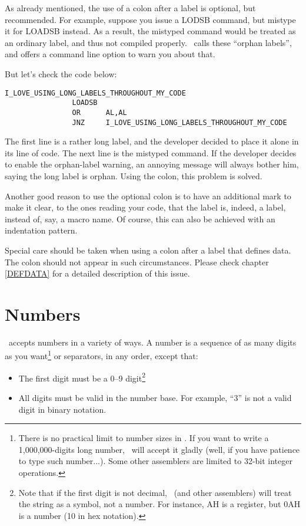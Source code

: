 \documentclass[a4paper,draft,12pt]{book}
\begin{document}
As already mentioned, the use of a colon after a label is optional,
but recommended. For example, suppose you issue a LODSB command, but
mistype it for LOADSB instead. As a result, the mistyped command would
be treated as an ordinary label, and thus not compiled properly. \nasm\ 
calls these ``orphan labels'', and offers a command line option to
warn you about that.

But let's check the code below:

\begin{verbatim}
I_LOVE_USING_LONG_LABELS_THROUGHOUT_MY_CODE
                LOADSB
                OR      AL,AL
                JNZ     I_LOVE_USING_LONG_LABELS_THROUGHOUT_MY_CODE
\end{verbatim}

The first line is a rather long label, and the developer decided
to place it alone in its line of code. The next line is the mistyped
command. If the developer decides to enable the orphan-label warning,
an annoying message will always bother him, saying the long label
is orphan. Using the colon, this problem is solved.

Another good reason to use the optional colon is to have an additional
mark to make it clear, to the ones reading your code, that the label is,
indeed, a label, instead of, say, a macro name. Of course, this can
also be achieved with an indentation pattern.

Special care should be taken when using a colon after a label that
defines data. The colon should not appear in such circumstances. Please
check chapter \ref{DEFDATA} for a detailed description of this issue.

\chapter{Numbers\label{NUMCHAP}}
\popasm\ accepts numbers in a variety of ways. A number is a sequence
of as many digits as you want\footnote{There is no practical limit to
number sizes in \popasm. If you want to write a 1,000,000-digits long
number, \popasm\ will accept it gladly (well, if you have patience to
type such number...). Some other assemblers are limited to 32-bit
integer operations.} or separators, in any order, except that:

\begin{itemize}
\item{The first digit must be a 0--9 digit\footnote{Note that if the
   first digit is not decimal, \popasm\ (and other assemblers) will treat
   the string as a symbol, not a number. For instance, AH is a register,
   but 0AH is a number (10 in hex notation).}}
\item{All digits must be valid in the number base.} For example, ``3'' is
   not a valid digit in binary notation.
\end{itemize}
\end{document}
